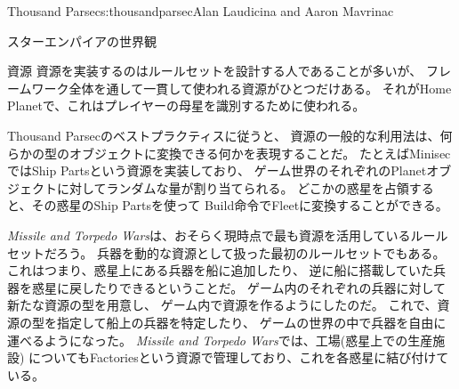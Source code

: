 \begin{aosachapter}{Thousand Parsec}{s:thousandparsec}{Alan Laudicina and Aaron Mavrinac}
\begin{aosasect1}{スターエンパイアの世界観}
\begin{aosasect2}{資源}
資源を実装するのはルールセットを設計する人であることが多いが、
フレームワーク全体を通して一貫して使われる資源がひとつだけある。
それがHome Planetで、これはプレイヤーの母星を識別するために使われる。

Thousand Parsecのベストプラクティスに従うと、
資源の一般的な利用法は、何らかの型のオブジェクトに変換できる何かを表現することだ。
たとえばMinisecではShip Partsという資源を実装しており、
ゲーム世界のそれぞれのPlanetオブジェクトに対してランダムな量が割り当てられる。
どこかの惑星を占領すると、その惑星のShip Partsを使って
Build命令でFleetに変換することができる。

\emph{Missile and Torpedo Wars}は、おそらく現時点で最も資源を活用しているルールセットだろう。
兵器を動的な資源として扱った最初のルールセットでもある。
これはつまり、惑星上にある兵器を船に追加したり、
逆に船に搭載していた兵器を惑星に戻したりできるということだ。
ゲーム内のそれぞれの兵器に対して新たな資源の型を用意し、
ゲーム内で資源を作るようにしたのだ。
これで、資源の型を指定して船上の兵器を特定したり、
ゲームの世界の中で兵器を自由に運べるようになった。
\emph{Missile and Torpedo Wars}では、工場(惑星上での生産施設)
についてもFactoriesという資源で管理しており、これを各惑星に結び付けている。

\end{aosasect2}


\end{aosasect1}
\end{aosachapter}
